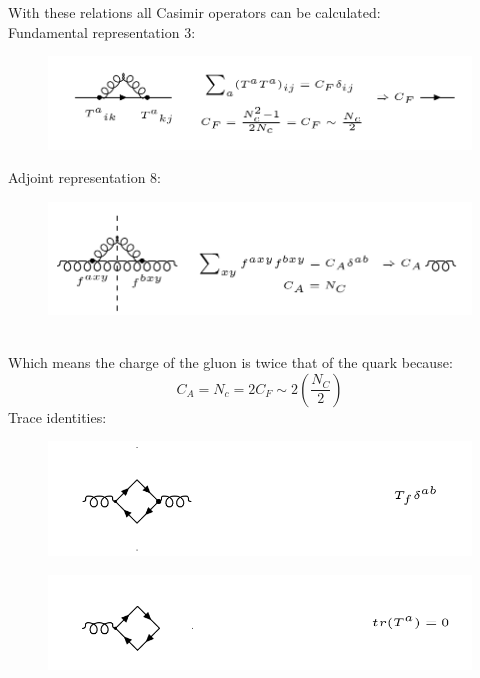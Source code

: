 With these relations all Casimir operators can be calculated:\\
Fundamental representation 3:\\
\begin{figure}[h!]
\centering
\includegraphics[scale=0.6]{images/Intro/Casimir1.png}
\end{figure}
Adjoint representation 8:\\
\begin{figure}[h!]
\centering
\includegraphics[scale=0.6]{images/Intro/Casimir2.png}
\end{figure}
\pagebreak
\\
Which means the charge of the gluon is twice that of the quark because:
\begin{equation}
 C_A = N_c =2C_F \sim 2(\frac{N_C}{2}) 
\end{equation}
Trace identities:\\
\begin{figure}[h!]
\centering
\includegraphics[scale=0.6]{images/Intro/Casimir3.png}
\end{figure}
\begin{figure}[h!]
\centering
\includegraphics[scale=0.6]{images/Intro/Casimir4.png}
\end{figure}


